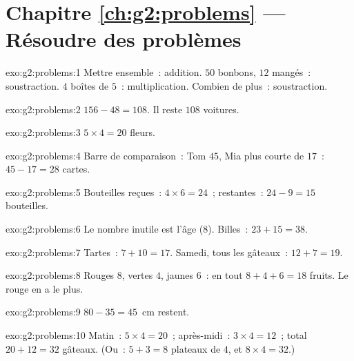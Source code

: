 \section*{Chapitre \ref{ch:g2:problems} --- Résoudre des problèmes}

\begin{solution}{exo:g2:problems:1}
Mettre ensemble~: addition. $50$ bonbons, $12$ mangés~:
soustraction. $4$ boîtes de $5$~: multiplication. Combien de
plus~: soustraction.
\end{solution}

\begin{solution}{exo:g2:problems:2}
$156 - 48 = 108$. Il reste $108$ voitures.
\end{solution}

\begin{solution}{exo:g2:problems:3}
$5 \times 4 = 20$ fleurs.
\end{solution}

\begin{solution}{exo:g2:problems:4}
Barre de comparaison~: Tom $45$, Mia plus courte de $17$~:
$45 - 17 = 28$ cartes.
\end{solution}

\begin{solution}{exo:g2:problems:5}
Bouteilles reçues~: $4 \times 6 = 24$~; restantes~:
$24 - 9 = 15$ bouteilles.
\end{solution}

\begin{solution}{exo:g2:problems:6}
Le nombre inutile est l'âge ($8$). Billes~:
$23 + 15 = 38$.
\end{solution}

\begin{solution}{exo:g2:problems:7}
Tartes~: $7 + 10 = 17$. Samedi, tous les gâteaux~:
$12 + 7 = 19$.
\end{solution}

\begin{solution}{exo:g2:problems:8}
Rouges $8$, vertes $4$, jaunes $6$~: en tout
$8 + 4 + 6 = 18$ fruits. Le rouge en a le plus.
\end{solution}

\begin{solution}{exo:g2:problems:9}
$80 - 35 = 45$~cm restent.
\end{solution}

\begin{solution}{exo:g2:problems:10}
Matin~: $5 \times 4 = 20$~; après-midi~: $3 \times 4 = 12$~; total
$20 + 12 = 32$ gâteaux. (Ou~: $5 + 3 = 8$ plateaux de $4$, et
$8 \times 4 = 32$.)
\end{solution}
